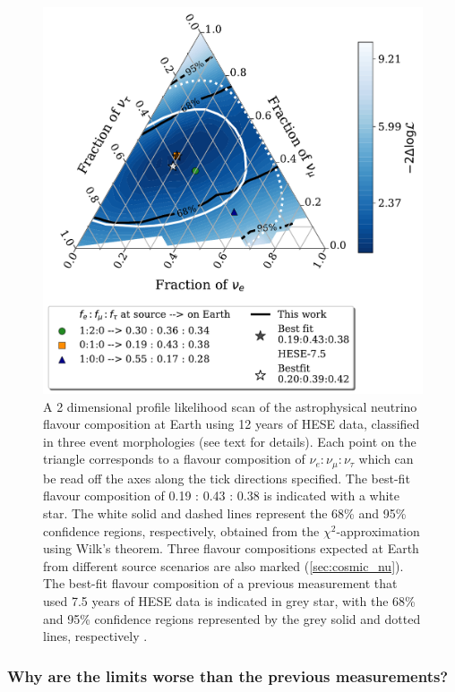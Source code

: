 \begin{figure}[h!]
    
    \includegraphics{./figures/results/HESE12_fancy_coverage_say_withhese7.pdf}
    \caption{A 2 dimensional profile likelihood scan of the astrophysical neutrino flavour composition at Earth using 12 years of HESE data, classified in three event morphologies (see text for details). Each point on the triangle corresponds to a flavour composition of $\nu_e : \nu_{\mu} : \nu_{\tau}$ which can be read off the axes along the tick directions specified. The best-fit flavour composition of 0.19 : 0.43 : 0.38 is indicated with a white star. The white solid and dashed lines represent the 68\% and 95\% confidence regions, respectively, obtained from the $\chi^2$-approximation using Wilk's theorem. Three flavour compositions expected at Earth from different source scenarios are also marked (\ref{sec:cosmic_nu}). The best-fit flavour composition of a previous measurement that used 7.5 years of HESE data is indicated in grey star, with the 68\% and 95\% confidence regions represented by the grey solid and dotted lines, respectively \cite{Juliana_paper}.}

\end{figure}

\subsubsection{Why are the limits worse than the previous measurements?}

